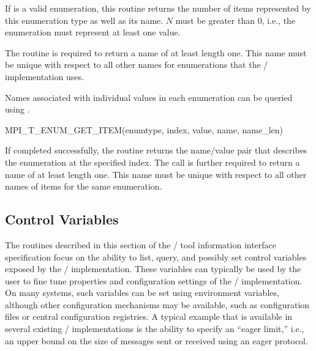 If  is a valid enumeration, this routine returns the
number of items represented by this enumeration type as well as its name.
$N$ must be greater than $0$, i.e., the enumeration must represent at least
one value.



The routine is required to return a name of at least length one.  This name
must be unique with respect to all other names for enumerations that the
\MPI/ implementation uses.


Names associated with individual values in each enumeration
 can be queried using .


\begin{funcdef}{MPI\_T\_ENUM\_GET\_ITEM}{(\mbox{enumtype}, \mbox{index}, \mbox{value}, \mbox{name}, \mbox{name\_len})}
\end{funcdef}


If completed successfully, the routine returns the name/value pair that
describes the enumeration at the specified index.  The call is further
required to return a name of at least length one.  This name must be unique
with respect to all other names of items for the same enumeration.


\subsection{Control Variables}
\label{sec:mpit:cvar}

The routines described in this section of the \MPI/ tool information
interface specification focus on the ability to list, query, and possibly
set control variables exposed by the \MPI/ implementation.  These variables
can typically be used by the user to fine tune properties and configuration
settings of the \MPI/ implementation.  On many systems, such variables can
be set using environment variables, although other configuration mechanisms
may be available, such as configuration files or central configuration
registries.  A typical example that is available in several existing \MPI/
implementations is the ability to specify an ``eager limit,'' i.e., an
upper bound on the size of messages sent or received using an eager
protocol.


